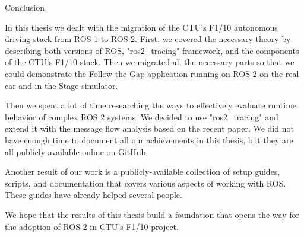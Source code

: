 \chap[conclusion] Conclusion

In this thesis we dealt with the migration of the CTU's F1/10 autonomous driving stack from ROS 1 to ROS 2. First, we covered the necessary theory by describing both versions of ROS, "ros2_tracing" framework, and the components of the CTU's F1/10 stack. Then we migrated all the necessary parts so that we could demonstrate the Follow the Gap application running on ROS 2 on the real car and in the Stage simulator.

Then we spent a lot of time researching the ways to effectively evaluate runtime behavior of complex ROS 2 systems. We decided to use "ros2_tracing" and extend it with the message flow analysis based on the recent paper.
We did not have enough time to document all our achievements in this thesis, but they are all publicly available online on GitHub.

Another result of our work is a publicly-available collection of setup guides, scripts, and documentation that covers various aspects of working with ROS. These guides have already helped several people.

We hope that the results of this thesis build a foundation that opens the way for the adoption of ROS 2 in CTU's F1/10 project.
